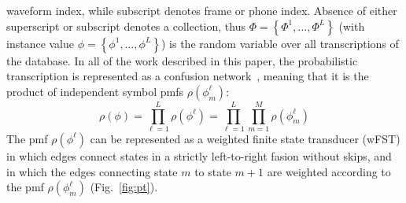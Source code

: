 waveform index, while subscript denotes frame or phone index.
Absence of either superscript or subscript denotes a collection, thus
$\Phi=\left\{\Phi^1,\ldots,\Phi^L\right\}$ (with instance value
$\phi=\left\{\phi^1,\ldots,\phi^L\right\}$) is the random variable
over all transcriptions of the database.  In all of the work described
in this paper, the probabilistic transcription is represented as a
confusion network~\cite{Mangu00}, meaning that it is the product of
independent symbol pmfs $\rho(\phi_m^\ell)$:
\begin{equation}
  \rho(\phi)=\prod_{\ell=1}^L\rho(\phi^\ell)=
  \prod_{\ell=1}^L \prod_{m=1}^M \rho(\phi_m^{\ell})
\end{equation}
The pmf $\rho(\phi^\ell)$ can be represented as a weighted
finite state transducer (wFST) in which edges connect states in a
strictly left-to-right fasion without skips, and in which the edges
connecting state $m$ to state $m+1$ are weighted according to the pmf
$\rho(\phi_m^\ell)$ (Fig.~\ref{fig:pt}).
